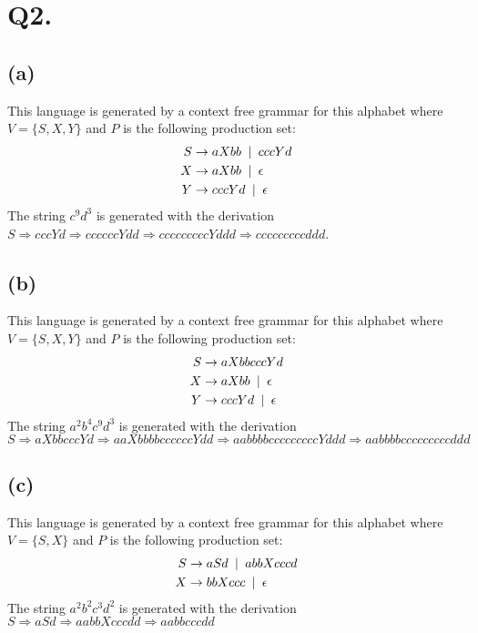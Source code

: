 \documentclass{article}
\begin{document}
	\section*{Q2.}
	\subsection*{(a)}
		This language is generated by a context free grammar for this alphabet where $V = \{S, X, Y\}$ and $P$ is the following production set:
		\begin{align*}
			S &\rightarrow aXbb \hphantom{a} | \hphantom{a} cccYd\\
			X &\rightarrow aXbb \hphantom{a} | \hphantom{a} \epsilon\\
			Y &\rightarrow cccYd \hphantom{a} | \hphantom{a} \epsilon
		\end{align*}
	The string $c^9d^3$ is generated with the derivation $S \Rightarrow cccYd \Rightarrow ccccccYdd \Rightarrow cccccccccYddd \Rightarrow cccccccccddd$.
	\subsection*{(b)}
	This language is generated by a context free grammar for this alphabet where $V = \{S, X, Y\}$ and $P$ is the following production set:
		\begin{align*}
			S &\rightarrow aXbbcccYd\\
			X &\rightarrow aXbb \hphantom{a} | \hphantom{a} \epsilon\\
			Y &\rightarrow cccYd \hphantom{a} | \hphantom{a} \epsilon
		\end{align*}
	The string $a^2b^4c^9d^3$ is generated with the derivation $S \Rightarrow aXbbcccYd \Rightarrow aaXbbbbccccccYdd \Rightarrow aabbbbcccccccccYddd \Rightarrow aabbbbcccccccccddd$
	\subsection*{(c)}
	This language is generated by a context free grammar for this alphabet where $V = \{S, X\}$ and $P$ is the following production set:
		\begin{align*}
			S &\rightarrow aSd \hphantom{a} | \hphantom{a} abbXcccd\\
			X &\rightarrow bbXccc \hphantom{a} | \hphantom{a} \epsilon
		\end{align*}
	The string $a^2b^2c^3d^2$ is generated with the derivation $S \Rightarrow aSd \Rightarrow aabbXcccdd \Rightarrow aabbcccdd$
\end{document}
